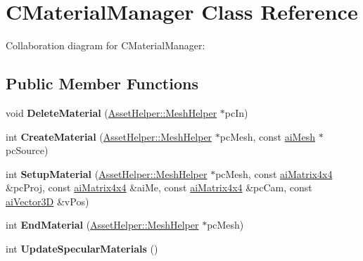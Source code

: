 \hypertarget{class_c_material_manager}{\section{C\+Material\+Manager Class Reference}
\label{class_c_material_manager}
}


Collaboration diagram for C\+Material\+Manager\+:
\subsection*{Public Member Functions}
\begin{DoxyCompactItemize}
\item 
\hypertarget{class_c_material_manager_a0b1c782eafdaa958af204e0c41e551ec}{void {\bfseries Delete\+Material} (\hyperlink{class_asset_helper_1_1_mesh_helper}{Asset\+Helper\+::\+Mesh\+Helper} $\ast$pc\+In)}\label{class_c_material_manager_a0b1c782eafdaa958af204e0c41e551ec}

\item 
\hypertarget{class_c_material_manager_abf609b4373908512d5393c9794cbfc26}{int {\bfseries Create\+Material} (\hyperlink{class_asset_helper_1_1_mesh_helper}{Asset\+Helper\+::\+Mesh\+Helper} $\ast$pc\+Mesh, const \hyperlink{structai_mesh}{ai\+Mesh} $\ast$pc\+Source)}\label{class_c_material_manager_abf609b4373908512d5393c9794cbfc26}

\item 
\hypertarget{class_c_material_manager_a46bd49c01815fb085cea702e5195d7da}{int {\bfseries Setup\+Material} (\hyperlink{class_asset_helper_1_1_mesh_helper}{Asset\+Helper\+::\+Mesh\+Helper} $\ast$pc\+Mesh, const \hyperlink{structai_matrix4x4}{ai\+Matrix4x4} \&pc\+Proj, const \hyperlink{structai_matrix4x4}{ai\+Matrix4x4} \&ai\+Me, const \hyperlink{structai_matrix4x4}{ai\+Matrix4x4} \&pc\+Cam, const \hyperlink{structai_vector3_d}{ai\+Vector3\+D} \&v\+Pos)}\label{class_c_material_manager_a46bd49c01815fb085cea702e5195d7da}

\item 
\hypertarget{class_c_material_manager_a2bec2a78064d92209ceb6545a586f620}{int {\bfseries End\+Material} (\hyperlink{class_asset_helper_1_1_mesh_helper}{Asset\+Helper\+::\+Mesh\+Helper} $\ast$pc\+Mesh)}\label{class_c_material_manager_a2bec2a78064d92209ceb6545a586f620}

\item 
\hypertarget{class_c_material_manager_a825ee9c40aaadcee7da339b0ac860a66}{int {\bfseries Update\+Specular\+Materials} ()}\label{class_c_material_manager_a825ee9c40aaadcee7da339b0ac860a66}


\end{DoxyCompactItemize}
